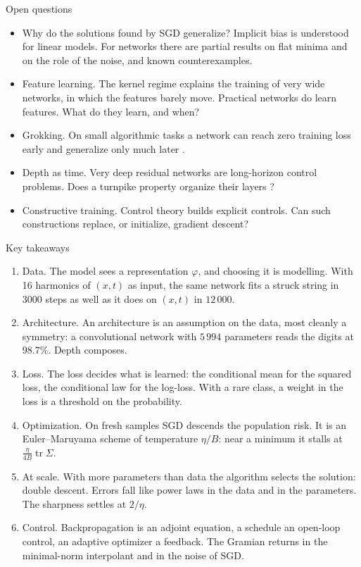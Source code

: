 \documentclass[10pt]{beamer}
\begin{document}
\begin{frame}{Open questions}
\small
\begin{itemize}
\item \alert{Why do the solutions found by SGD generalize?} Implicit bias is understood for linear models. For networks there are partial results on flat minima and on the role of the noise, and known counterexamples.
\item \alert{Feature learning.} The kernel regime explains the training of very wide networks, in which the features barely move. Practical networks do learn features. What do they learn, and when?
\item \alert{Grokking.} On small algorithmic tasks a network can reach zero training loss early and generalize only much later \citep{power2022}.
\item \alert{Depth as time.} Very deep residual networks are long-horizon control problems. Does a turnpike property organize their layers \citep{geshkovski2022}?
\item \alert{Constructive training.} Control theory builds explicit controls. Can such constructions replace, or initialize, gradient descent?
\end{itemize}
\end{frame}


\begin{frame}{Key takeaways}
\footnotesize
\begin{enumerate}
\item \alert{Data.} The model sees a representation $\varphi$, and choosing it is modelling. With 16 harmonics of $(x,t)$ as input, the same network fits a struck string in $3000$ steps as well as it does on $(x,t)$ in $12\,000$.
\item \alert{Architecture.} An architecture is an assumption on the data, most cleanly a symmetry: a convolutional network with $5\,994$ parameters reads the digits at $98.7\%$. Depth composes.
\item \alert{Loss.} The loss decides what is learned: the conditional mean for the squared loss, the conditional law for the log-loss. With a rare class, a weight in the loss is a threshold on the probability.
\item \alert{Optimization.} On fresh samples SGD descends the population risk. It is an Euler--Maruyama scheme of temperature $\eta/B$: near a minimum it stalls at $\tfrac{\eta}{4B}\operatorname{tr}\Sigma$.
\item \alert{At scale.} With more parameters than data the algorithm selects the solution: double descent. Errors fall like power laws in the data and in the parameters. The sharpness settles at $2/\eta$.
\item \alert{Control.} Backpropagation is an adjoint equation, a schedule an open-loop control, an adaptive optimizer a feedback. The Gramian returns in the minimal-norm interpolant and in the noise of SGD.
\end{enumerate}
\end{frame}
\end{document}
